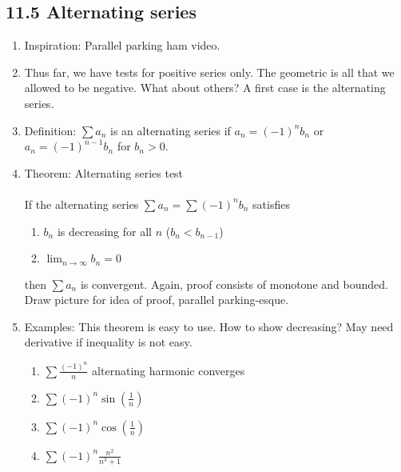 \documentclass{article}
\newcommand{\ds}{\displaystyle}
\begin{document}
\subsection{11.5 Alternating series}
\begin{enumerate}

\item Inspiration: Parallel parking ham video.

\item Thus far, we have tests for positive series only. The geometric is all that we allowed to be negative. What about others? A first case is the alternating series.

\item Definition: $\sum a_n$ is an alternating series if $a_n=(-1)^nb_n$ or $a_n=(-1)^{n-1}b_n$ for $b_n>0$.

\item Theorem: Alternating series test \\ \ \\
If the alternating series $\sum a_n = \sum (-1)^n b_n$ satisfies
\begin{enumerate}
\item $b_n$ is decreasing for all $n$ ($b_n < b_{n-1}$)
\item $\displaystyle\lim_{n\rightarrow \infty} b_n = 0$
\end{enumerate}
then $\sum a_n$ is convergent. Again, proof consists of monotone and bounded. Draw picture for idea of proof, parallel parking-esque.

\item Examples: This theorem is easy to use. How to show decreasing? May need derivative if inequality is not easy.
\begin{enumerate}
\item $\ds \sum \frac{(-1)^n}{n}$ alternating harmonic converges
\item $\ds \sum (-1)^n\sin(\frac{1}{n})$
\item $\ds \sum (-1)^n\cos(\frac{1}{n})$
\item $\ds \sum (-1)^n\frac{n^2}{n^3+1}$
\end{enumerate}


\end{enumerate}
\end{document}
